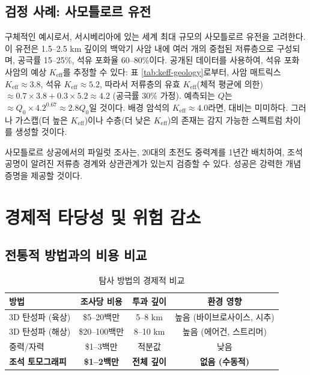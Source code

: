 \documentclass[12pt,a4paper]{article}
\theoremstyle{remark}
\newcommand{\Keff}{K_{\mathrm{eff}}}
\begin{document}
	\subsection{검정 사례: 사모틀로르 유전}
	
	구체적인 예시로서, 서시베리아에 있는 세계 최대 규모의 사모틀로르 유전을 고려한다. 이 유전은 1.5–2.5 km 깊이의 백악기 사암 내에 여러 개의 중첩된 저류층으로 구성되며, 공극률 15–25\%, 석유 포화율 60–80\%이다. 공개된 데이터를 사용하여, 석유 포화 사암의 예상 \(\Keff\)를 추정할 수 있다: 표 \ref{tab:keff-geology}로부터, 사암 매트릭스 \(\Keff \approx 3.8\), 석유 \(\Keff \approx 5.2\), 따라서 저류층의 유효 \(\Keff\)(체적 평균에 의한) \(\approx 0.7 \times 3.8 + 0.3 \times 5.2 \approx 4.2\) (공극률 30\% 가정). 예측되는 \(Q\)는 \(\approx Q_0 \times 4.2^{0.67} \approx 2.8 Q_0\)일 것이다. 배경 암석의 \(\Keff \approx 4.0\)라면, 대비는 미미하다. 그러나 가스캡(더 높은 \(\Keff\))이나 수층(더 낮은 \(\Keff\))의 존재는 감지 가능한 스펙트럼 차이를 생성할 것이다.
	
	사모틀로르 상공에서의 파일럿 조사는, 20대의 초전도 중력계를 1년간 배치하여, 조석 공명이 알려진 저류층 경계와 상관관계가 있는지 검증할 수 있다. 성공은 강력한 개념 증명을 제공할 것이다.
	
	\section{경제적 타당성 및 위험 감소}
	\label{sec:economics}
	
	\subsection{전통적 방법과의 비용 비교}
	
	\begin{table}[htbp]
		\centering
		\caption{탐사 방법의 경제적 비교}
		\label{tab:economics}
		\small
		\begin{tabular}{lccc}
			\toprule
			\textbf{방법} & \textbf{조사당 비용} & \textbf{투과 깊이} & \textbf{환경 영향} \\
			\midrule
			3D 탄성파 (육상) & \$5–20백만 & 5–8 km & 높음 (바이브로사이스, 시추) \\
			3D 탄성파 (해상) & \$20–100백만 & 8–10 km & 높음 (에어건, 스트리머) \\
			중력/자력 & \$1–3백만 & 적분값 & 낮음 \\
			\textbf{조석 토모그래피} & \textbf{\$1–2백만} & \textbf{전체 깊이} & \textbf{없음 (수동적)} \\
			\bottomrule
		\end{tabular}
	\end{table}
	
\end{document}
